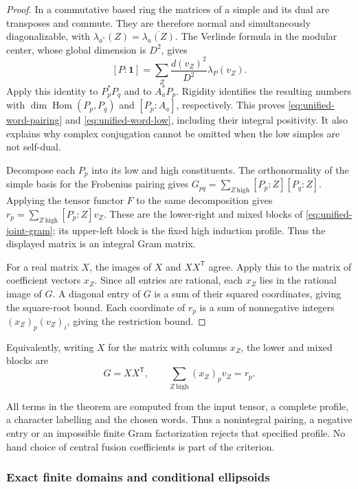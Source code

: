 \begin{proof}
In a commutative based ring the matrices of a simple and its dual are
transposes and commute. They are therefore normal and simultaneously
diagonalizable, with
$\lambda_{a^*}(Z)=\overline{\lambda_a(Z)}$.
The Verlinde formula in the modular center, whose global dimension is
$D^2$, gives
\[
 [P:\mathbf1]=\sum_Z\frac{d(v_Z)^2}{D^2}\lambda_P(v_Z).
\]
Apply this identity to $P_p^*P_q$ and to $A_a^*P_p$.
Rigidity identifies the resulting numbers with
$\dim\operatorname{Hom}(P_p,P_q)$ and $[P_p:A_a]$, respectively.
This proves \eqref{eq:unified-word-pairing} and
\eqref{eq:unified-word-low}, including their integral positivity.
It also explains why complex conjugation cannot be omitted when the low
simples are not self-dual.

Decompose each $P_p$ into its low and high constituents. The orthonormality
of the simple basis for the Frobenius pairing gives
$G_{pq}=\sum_{Z\ \mathrm{high}}[P_p:Z][P_q:Z]$.
Applying the tensor functor $F$ to the same decomposition gives
$r_p=\sum_{Z\ \mathrm{high}}[P_p:Z]v_Z$.
These are the lower-right and mixed blocks of
\eqref{eq:unified-joint-gram}; its upper-left block is the fixed high
induction profile. Thus the displayed matrix is an integral Gram matrix.

For a real matrix $X$, the images of $X$ and $XX^{\mathsf T}$ agree.
Apply this to the matrix of coefficient vectors $x_Z$. Since all entries
are rational, each $x_Z$ lies in the rational image of $G$.
A diagonal entry of $G$ is a sum of their squared coordinates, giving
the square-root bound. Each coordinate of $r_p$ is a sum of nonnegative
integers $(x_Z)_p(v_Z)_i$, giving the restriction bound.
\end{proof}

Equivalently, writing $X$ for the matrix with columns $x_Z$, the
lower and mixed blocks are
\begin{equation}\label{eq:joint-low-product-gram}
 G=XX^{\mathsf T},\qquad
 \sum_{Z\ \mathrm{high}}(x_Z)_p v_Z=r_p.
\end{equation}

All terms in the theorem are computed from the input tensor, a complete
profile, a character labelling and the chosen words. Thus a nonintegral
pairing, a negative entry or an impossible finite Gram factorization rejects
that specified profile. No hand choice of central fusion coefficients is
part of the criterion.

\subsubsection{Exact finite domains and conditional ellipsoids}

